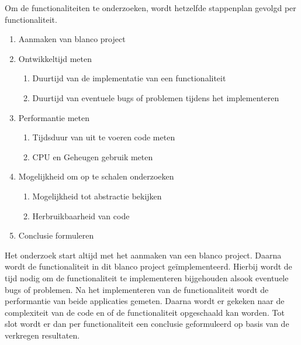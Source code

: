 Om de functionaliteiten te onderzoeken, wordt hetzelfde stappenplan gevolgd per functionaliteit. 
\begin{enumerate}
    \item Aanmaken van blanco project
    \item Ontwikkeltijd meten
    \begin{enumerate}
        \item Duurtijd van de implementatie van een functionaliteit
        \item Duurtijd van eventuele bugs of problemen tijdens het implementeren
    \end{enumerate}
    \item Performantie meten
    \begin{enumerate}
        \item Tijdsduur van uit te voeren code meten
        \item CPU en Geheugen gebruik meten
    \end{enumerate}
    \item Mogelijkheid om op te schalen onderzoeken
    \begin{enumerate}
        \item Mogelijkheid tot abstractie bekijken
        \item Herbruikbaarheid van code
    \end{enumerate}
    \item Conclusie formuleren
\end{enumerate}
Het onderzoek start altijd met het aanmaken van een blanco project. 
Daarna wordt de functionaliteit in dit blanco project geïmplementeerd. 
Hierbij wordt de tijd nodig om de functionaliteit te implementeren 
bijgehouden alsook eventuele bugs of problemen. Na het implementeren van de 
functionaliteit wordt de performantie van beide applicaties gemeten. 
Daarna wordt er gekeken naar de complexiteit van de code en of de functionaliteit 
opgeschaald kan worden. Tot slot wordt er dan per functionaliteit een conclusie 
geformuleerd op basis van de verkregen resultaten.
